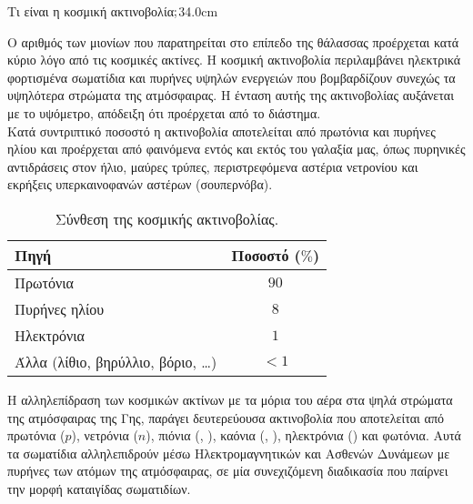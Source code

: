 \begin{MyColumnLeft}[detach title,before upper={\tcbtitle\quad}]{Τι είναι η κοσμική ακτινοβολία$\bf{;}$}{34.0cm}

Ο αριθμός των μιονίων που παρατηρείται στο επίπεδο της θάλασσας προέρχεται κατά
κύριο λόγο από τις κοσμικές ακτίνες. Η κοσμική ακτινοβολία
περιλαμβάνει ηλεκτρικά φορτισμένα σωματίδια και πυρήνες υψηλών
ενεργειών που βομβαρδίζουν συνεχώς τα υψηλότερα στρώματα της ατμόσφαιρας.
Η ένταση αυτής της ακτινοβολίας αυξάνεται με το υψόμετρο, απόδειξη ότι προέρχεται
από το διάστημα. \\

Κατά συντριπτικό ποσοστό η ακτινοβολία αποτελείται από πρωτόνια
και πυρήνες ηλίου και προέρχεται από φαινόμενα εντός και εκτός του
γαλαξία μας, όπως πυρηνικές αντιδράσεις στον ήλιο, μαύρες τρύπες,
περιστρεφόμενα αστέρια νετρονίου και εκρήξεις υπερκαινοφανών αστέρων (σουπερνόβα). 

\renewcommand{\arraystretch}{1.15}
\begin{table}[p]
  \caption{Σύνθεση της κοσμικής ακτινοβολίας.}%
  \centering
  \begin{tabular}{l c}
    \hline
    Πηγή & Ποσοστό ($\%$) \\
    \hline
    Πρωτόνια      & $90$ \\
    Πυρήνες ηλίου & $8$ \\
    Ηλεκτρόνια    & $1$ \\
    Άλλα (λίθιο, βηρύλλιο, βόριο, \ldots) & $ <1$ \\
    \hline
  \end{tabular}
\end{table}
\renewcommand{\arraystretch}{1.0}
\vspace{0.5cm}

Η αλληλεπίδραση των κοσμικών ακτίνων με τα μόρια του αέρα στα ψηλά
στρώματα της ατμόσφαιρας της Γης, παράγει δευτερεύουσα ακτινοβολία που
αποτελείται από πρωτόνια ($p$), νετρόνια ($n$), πιόνια (,
\mPion{\pm}), καόνια (, \mKaon{\pm}{}), ηλεκτρόνια (\lE{\pm})
και φωτόνια. Αυτά τα σωματίδια αλληλεπιδρούν μέσω Ηλεκτρομαγνητικών και Ασθενών
Δυνάμεων με πυρήνες των ατόμων της ατμόσφαιρας, σε μία συνεχιζόμενη διαδικασία που παίρνει
την μορφή καταιγίδας σωματιδίων.

\end{MyColumnLeft}


